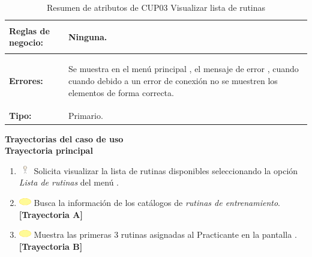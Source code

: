 \begin{table}[H]
\begin{tabular}{| l | p{12 cm} |}
\hline
\textbf{Reglas de negocio:} & \vspace{-2mm}	%
							\begin{compactitem}
								\item Ninguna.
							\end{compactitem}\\							
\hline
\textbf{Errores:} &	\vspace{-2mm}	%
							\begin{compactitem}
								\item Se muestra en el menú principal \nameref{menu:MP01}, el mensaje de error \nameref{msj:MSG24}, cuando cuando debido a un error de conexión no se muestren los elementos de forma correcta.
							\end{compactitem}\\
\hline
\textbf{Tipo:} & Primario.\\
\hline	
\end{tabular}
\caption{Resumen de atributos de CUP03 Visualizar lista de rutinas}
\label{tab:CUP03}
\end{table} 

\textbf{\textcolor[rgb]{0, 0, 0.545098}{Trayectorias del caso de uso}} \\

\textbf{\large{Trayectoria principal}}

\begin{enumerate}
	\item \includegraphics[width=15pt, height=10pt]{./Figuras/iconosCU/usuario.png} Solicita visualizar la lista de rutinas disponibles seleccionando la opción \textit{Lista de rutinas} del menú .
	\item \includegraphics[width=15pt]{./Figuras/iconosCU/herramienta.png} Busca la información de los catálogos de \textit{rutinas de entrenamiento}. \textbf{[Trayectoria A]}
	\item \includegraphics[width=15pt]{./Figuras/iconosCU/herramienta.png} Muestra las primeras 3 rutinas asignadas al Practicante en la pantalla . \textbf{[Trayectoria B]}
\end{enumerate}
	
